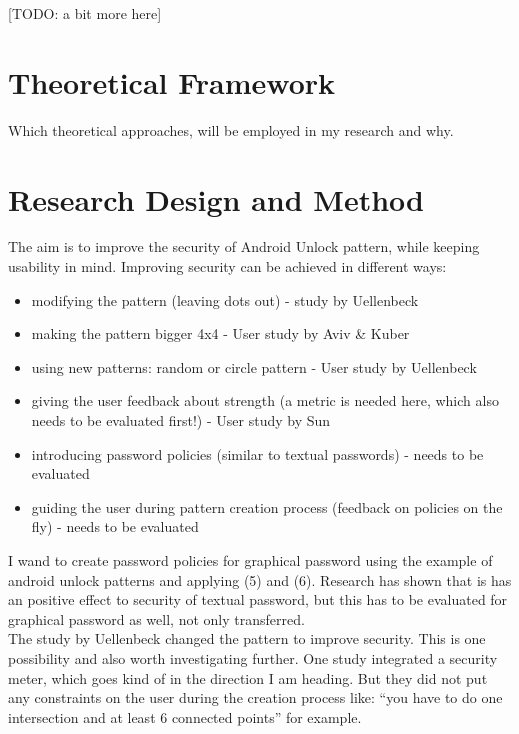 \documentclass[twocolumn, a4paper, 10pt]{article}
\begin{document}
[TODO: a bit more here]\\

\section{Theoretical Framework}
Which theoretical approaches, will be employed in my research and why.

\section{Research Design and Method}

The aim is to improve the security of Android Unlock pattern, while keeping usability in mind. Improving security can be achieved in different ways:\\

\begin{itemize}
  \item modifying the pattern (leaving dots out) - study by Uellenbeck
  \item making the pattern bigger 4x4 - User study by Aviv \& Kuber
  \item using new patterns: random or circle pattern - User study by Uellenbeck
  \item giving the user feedback about strength (a metric is needed here, which also needs to be evaluated first!) - User study by Sun
  \item introducing password policies (similar to textual passwords) - needs to be evaluated 
  \item guiding the user during pattern creation process (feedback on policies on the fly) - needs to be evaluated
\end{itemize}

I wand to create password policies for graphical password using the example of android unlock patterns and applying (5) and (6). Research has shown that is has an positive effect to security of textual password, but this has to be evaluated for graphical password as well, not only transferred.\\

The study by Uellenbeck changed the pattern to improve security. This is one possibility and also worth investigating further. One study integrated a security meter, which goes kind of in the direction I am heading. But they did not put any constraints on the user during the creation process like: ``you have to do one intersection and at least 6 connected points'' for example.\\
\end{document}
